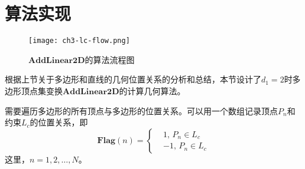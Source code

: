\section{算法实现}\label{sect:3.3}
\begin{figure}[!h]
 \centering
 \texttt{[image: ch3-lc-flow.png]}\\	 %
 \caption{$\mathbf{AddLinear2D}$的算法流程图}
 \label{fig.3.ic.flow}
\end{figure}
根据上节关于多边形和直线的几何位置关系的分析和总结，本节设计了$d_{1}=2$时多边形顶点集变换$\mathbf{AddLinear2D}$的计算几何算法。

需要遍历多边形的所有顶点与多边形的位置关系。可以用一个数组记录顶点$P_{n}$和约束$L_{c}$的位置关系，即
\begin{equation}%
\mathbf{Flag}(n)=\left\{
\begin{array}{ll}
&1\textbf{,  }P_{n}\in L_{c}\\
&-1\textbf{, }P_{n}\in L_{c}
\end{array}
\right.
\end{equation}
这里，$n=1,2,\ldots,N$。

